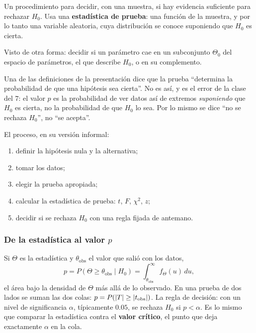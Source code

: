 \documentclass[11pt,letterpaper]{article}
\begin{document}
\begin{definicion}
    Un procedimiento para decidir, con una muestra, si hay evidencia
    suficiente para rechazar $H_0$. Usa una \textbf{estadística de
    prueba}: una función de la muestra, y por lo tanto una variable
    aleatoria, cuya distribución se conoce suponiendo que $H_0$ es
    cierta.
\end{definicion}

Visto de otra forma: decidir si un parámetro cae en un subconjunto
$\Theta_0$ del espacio de parámetros, el que describe $H_0$, o en su
complemento.

\begin{ojo}
    Una de las definiciones de la presentación dice que la prueba
    ``determina la probabilidad de que una hipótesis sea cierta''. No es
    así, y es el error de la clase del $7$: el valor $p$ es la
    probabilidad de ver datos así de extremos \emph{suponiendo} que
    $H_0$ es cierta, no la probabilidad de que $H_0$ lo sea. Por lo
    mismo se dice ``no se rechaza $H_0$'', no ``se acepta''.
\end{ojo}

El proceso, en su versión informal:
\begin{enumerate}[itemsep=0.2em]
    \item definir la hipótesis nula y la alternativa;
    \item tomar los datos;
    \item elegir la prueba apropiada;
    \item calcular la estadística de prueba: $t$, $F$, $\chi^2$, $z$;
    \item decidir si se rechaza $H_0$ con una regla fijada de antemano.
\end{enumerate}

\subsubsection*{De la estadística al valor $p$}

Si $\Theta$ es la estadística y $\theta_{\text{obs}}$ el valor que
salió con los datos,
\[
    p = P(\Theta \ge \theta_{\text{obs}} \mid H_0)
    = \int_{\theta_{\text{obs}}}^{\infty} f_\Theta(u)\, du ,
\]
el área bajo la densidad de $\Theta$ más allá de lo observado. En una
prueba de dos lados se suman las dos colas:
$p = P(\left\lvert T \right\rvert \ge \left\lvert t_{\text{obs}} \right\rvert)$. La regla de decisión: con un
nivel de significancia $\alpha$, típicamente $0.05$, se rechaza $H_0$
si $p < \alpha$. Es lo mismo que comparar la estadística contra el
\textbf{valor crítico}, el punto que deja exactamente $\alpha$ en la
cola.
\end{document}
